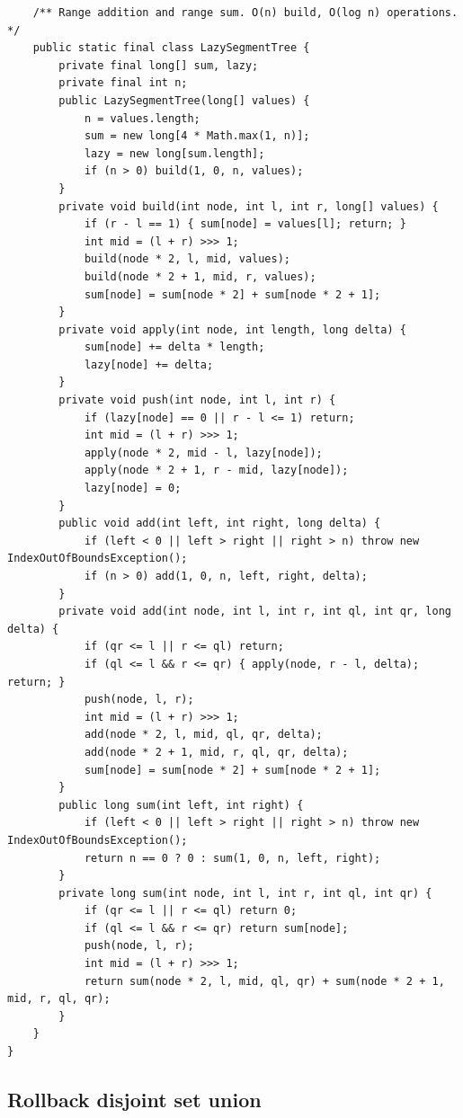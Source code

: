 \documentclass[10pt,letterpaper]{article}
\begin{document}
\begin{lstlisting}
    /** Range addition and range sum. O(n) build, O(log n) operations. */
    public static final class LazySegmentTree {
        private final long[] sum, lazy;
        private final int n;
        public LazySegmentTree(long[] values) {
            n = values.length;
            sum = new long[4 * Math.max(1, n)];
            lazy = new long[sum.length];
            if (n > 0) build(1, 0, n, values);
        }
        private void build(int node, int l, int r, long[] values) {
            if (r - l == 1) { sum[node] = values[l]; return; }
            int mid = (l + r) >>> 1;
            build(node * 2, l, mid, values);
            build(node * 2 + 1, mid, r, values);
            sum[node] = sum[node * 2] + sum[node * 2 + 1];
        }
        private void apply(int node, int length, long delta) {
            sum[node] += delta * length;
            lazy[node] += delta;
        }
        private void push(int node, int l, int r) {
            if (lazy[node] == 0 || r - l <= 1) return;
            int mid = (l + r) >>> 1;
            apply(node * 2, mid - l, lazy[node]);
            apply(node * 2 + 1, r - mid, lazy[node]);
            lazy[node] = 0;
        }
        public void add(int left, int right, long delta) {
            if (left < 0 || left > right || right > n) throw new IndexOutOfBoundsException();
            if (n > 0) add(1, 0, n, left, right, delta);
        }
        private void add(int node, int l, int r, int ql, int qr, long delta) {
            if (qr <= l || r <= ql) return;
            if (ql <= l && r <= qr) { apply(node, r - l, delta); return; }
            push(node, l, r);
            int mid = (l + r) >>> 1;
            add(node * 2, l, mid, ql, qr, delta);
            add(node * 2 + 1, mid, r, ql, qr, delta);
            sum[node] = sum[node * 2] + sum[node * 2 + 1];
        }
        public long sum(int left, int right) {
            if (left < 0 || left > right || right > n) throw new IndexOutOfBoundsException();
            return n == 0 ? 0 : sum(1, 0, n, left, right);
        }
        private long sum(int node, int l, int r, int ql, int qr) {
            if (qr <= l || r <= ql) return 0;
            if (ql <= l && r <= qr) return sum[node];
            push(node, l, r);
            int mid = (l + r) >>> 1;
            return sum(node * 2, l, mid, ql, qr) + sum(node * 2 + 1, mid, r, ql, qr);
        }
    }
}
\end{lstlisting}
\subsection{Rollback disjoint set union}
\end{document}
